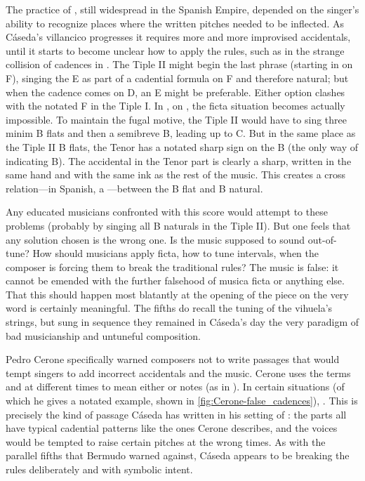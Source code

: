 The practice of , still widespread in the Spanish Empire,
depended on the singer's ability to recognize places where the written pitches
needed to be inflected.
As Cáseda's villancico progresses it requires more and more improvised
accidentals, until it starts to become unclear how to apply the rules, such as
in the strange collision of cadences in .
The Tiple II might begin the last phrase (starting in  on F),
singing the E as part of a cadential formula on F and therefore natural; but
when the cadence comes on D, an E\fl{} might be preferable. 
Either option clashes with the notated F\sh{} in the Tiple I.
In , on , the ficta situation becomes
actually impossible.
To maintain the fugal motive, the Tiple II would have to sing three minim B
flats and then a semibreve B\na, leading up to C.
But in the same place as the Tiple II B flats, the Tenor has a notated sharp
sign on the B (the only way of indicating B\na).
The accidental in the Tenor part is clearly a sharp, written in the same hand
and with the same ink as the rest of the music.
This creates a cross relation---in Spanish, a ---between
the B flat and B natural.

Any educated musicians confronted with this score would attempt to 
these problems (probably by singing all B naturals in the Tiple II).
But one feels that any solution chosen is the wrong one.
Is the music supposed to sound out-of-tune?
How should musicians apply ficta, how to tune intervals, when the composer is
forcing them to break the traditional rules?
The music is false: it cannot be emended with the further falsehood of musica
ficta or anything else.
That this should happen most blatantly at the opening of the piece on the very
word  is certainly meaningful.
The fifths do recall the tuning of the vihuela's strings, but sung in sequence
they remained in Cáseda's day the very paradigm of bad musicianship and
untuneful composition.

Pedro Cerone specifically warned composers not to write passages that would
tempt singers to add incorrect accidentals and  the music.
Cerone uses the terms  and  at different
times to mean either  or  notes (as in
).
In certain situations (of which he gives a notated example, shown in
\cref{fig:Cerone-false_cadences}), .%
    \Autocite[629]{Cerone:Melopeo}
This is precisely the kind of passage Cáseda has written in his setting of
: the parts all have typical cadential patterns like
the ones Cerone describes, and the voices would be tempted to raise certain
pitches at the wrong times. 
As with the parallel fifths that Bermudo warned against, Cáseda appears to be
breaking the rules deliberately and with symbolic intent.

